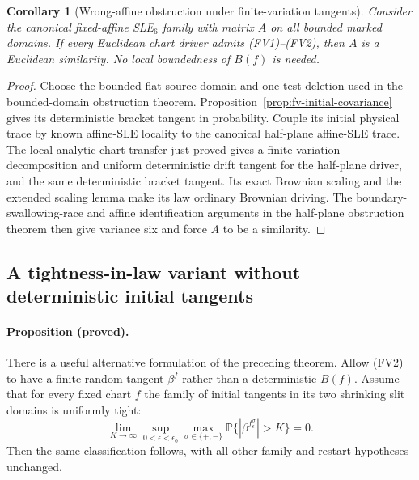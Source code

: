 \documentclass[11pt]{article}
\newtheorem{corollary}[theorem]{Corollary}
\theoremstyle{definition}\newtheorem{definition}[theorem]{Definition}
\theoremstyle{remark}\newtheorem{remark}[theorem]{Remark}
\begin{document}
\begin{corollary}[Wrong-affine obstruction under finite-variation tangents]
\label{cor:fv-wrong-affine}
Consider the canonical fixed-affine SLE$_6$ family with matrix $A$ on all
bounded marked domains. If every Euclidean chart driver admits (FV1)--(FV2),
then $A$ is a Euclidean similarity. No local boundedness of $B(f)$ is needed.
\end{corollary}
\begin{proof}
Choose the bounded flat-source domain and one test deletion used in the
bounded-domain obstruction theorem. Proposition~\ref{prop:fv-initial-covariance}
gives its deterministic bracket tangent in probability. Couple its initial
physical trace by known affine-SLE locality to the canonical half-plane
affine-SLE trace. The local analytic chart transfer just proved gives a
finite-variation decomposition and uniform deterministic drift tangent for
the half-plane driver, and the same deterministic bracket tangent.
Its exact Brownian scaling and the extended scaling lemma make its law
ordinary Brownian driving. The boundary-swallowing-race and affine
identification arguments in the half-plane obstruction theorem then give
variance six and force $A$ to be a similarity.
\end{proof}


\subsection{A tightness-in-law variant without deterministic initial tangents}

\paragraph{Proposition (proved).}
There is a useful alternative formulation of the preceding theorem.
Allow (FV2) to have a finite random tangent $\beta^f$ rather than a
deterministic $B(f)$. Assume that for every fixed chart $f$ the family of
initial tangents in its two shrinking slit domains is uniformly tight:
\[
 \lim_{K\to\infty}\sup_{0<\epsilon<\epsilon_0}
 \max_{\sigma\in\{+,-\}}
 \mathbb P\{|\beta^{f_\epsilon^\sigma}|>K\}=0.
 \tag{FV8}
\]
Then the same classification follows, with all other family and restart
hypotheses unchanged.
\end{document}
